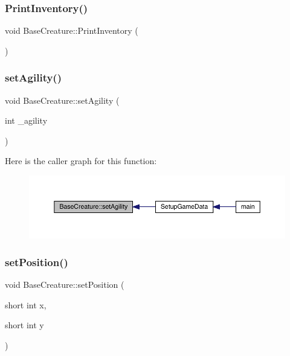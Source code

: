 \mbox{\label{class_base_creature_a097ec44d0b215f75ca75ae69c2bd11be}} 
\subsubsection{\texorpdfstring{Print\+Inventory()}{PrintInventory()}}
{\footnotesize\ttfamily void Base\+Creature\+::\+Print\+Inventory (\begin{DoxyParamCaption}{ }\end{DoxyParamCaption})}

\mbox{\label{class_base_creature_ad6357a6d4456d0b669abd1675efcca30}} 
\subsubsection{\texorpdfstring{set\+Agility()}{setAgility()}}
{\footnotesize\ttfamily void Base\+Creature\+::set\+Agility (\begin{DoxyParamCaption}\item[{int}]{\+\_\+agility }\end{DoxyParamCaption})}

Here is the caller graph for this function\+:
\nopagebreak
\begin{figure}[H]
\begin{center}
\leavevmode
\includegraphics[width=350pt]{d2/d3b/class_base_creature_ad6357a6d4456d0b669abd1675efcca30_icgraph}
\end{center}
\end{figure}
\mbox{\label{class_base_creature_a00ffc1ee732a8f0a8921c9cee6842e4d}} 
\subsubsection{\texorpdfstring{set\+Position()}{setPosition()}}
{\footnotesize\ttfamily void Base\+Creature\+::set\+Position (\begin{DoxyParamCaption}\item[{short int}]{x,  }\item[{short int}]{y }\end{DoxyParamCaption})}

